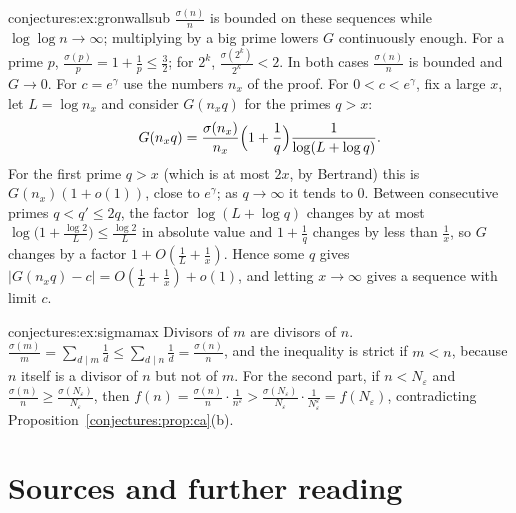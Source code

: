 \begin{solution}{conjectures:ex:gronwallsub}
\idea $\frac{\sigma(n)}n$ is bounded on these sequences while $\log\log n\to\infty$; multiplying by a big prime lowers $G$ continuously enough.
\writeup For a prime $p$, $\frac{\sigma(p)}p=1+\frac1p\le\frac32$; for $2^k$, $\frac{\sigma(2^k)}{2^k}<2$. In both cases $\frac{\sigma(n)}n$ is bounded and $G\to0$.
For $c=e^\gamma$ use the numbers $n_x$ of the proof. For $0<c<e^\gamma$, fix a large $x$, let $L=\log n_x$ and consider $G(n_xq)$ for the primes $q>x$:
\[
G(n_xq)=\frac{\sigma(n_x)}{n_x}\Bigl(1+\frac1q\Bigr)\frac1{\log(L+\log q)}.
\]
For the first prime $q>x$ (which is at most $2x$, by Bertrand) this is $G(n_x)(1+o(1))$, close to $e^\gamma$; as $q\to\infty$ it tends to $0$. Between consecutive
primes $q<q'\le2q$, the factor $\log(L+\log q)$ changes by at most $\log\bigl(1+\frac{\log2}L\bigr)\le\frac{\log2}L$ in absolute value and $1+\frac1q$ changes by less than $\frac1x$,
so $G$ changes by a factor $1+O(\frac1L+\frac1x)$. Hence some $q$ gives $|G(n_xq)-c|=O(\frac1L+\frac1x)+o(1)$, and letting $x\to\infty$ gives a sequence with
limit $c$.
\end{solution}

\begin{solution}{conjectures:ex:sigmamax}
\idea Divisors of $m$ are divisors of $n$.
\writeup $\frac{\sigma(m)}m=\sum_{d\mid m}\frac1d\le\sum_{d\mid n}\frac1d=\frac{\sigma(n)}n$, and the inequality is strict if $m<n$, because $n$ itself is a divisor of $n$ but not of $m$. For
the second part, if $n<N_\varepsilon$ and $\frac{\sigma(n)}n\ge\frac{\sigma(N_\varepsilon)}{N_\varepsilon}$, then $f(n)=\frac{\sigma(n)}n\cdot\frac1{n^\varepsilon}>\frac{\sigma(N_\varepsilon)}{N_\varepsilon}\cdot\frac1{N_\varepsilon^\varepsilon}=f(N_\varepsilon)$,
contradicting Proposition~\ref{conjectures:prop:ca}(b).
\end{solution}

\section*{Sources and further reading}

